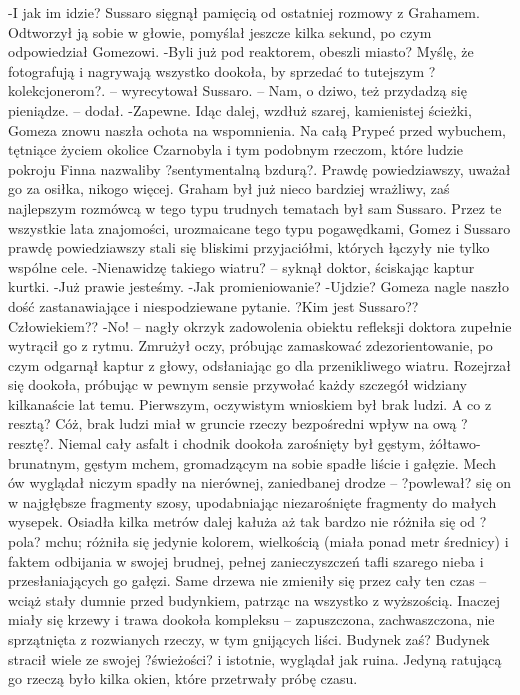 \documentclass[../MAIN.tex]{subfiles}
\begin{document}
-I jak im idzie?
Sussaro sięgnął pamięcią od ostatniej rozmowy z Grahamem. Odtworzył ją sobie w głowie, pomyślał jeszcze kilka sekund, po czym odpowiedział Gomezowi.
-Byli już pod reaktorem, obeszli miasto? Myślę, że fotografują i nagrywają wszystko dookoła, by sprzedać to tutejszym ?kolekcjonerom?. -- wyrecytował Sussaro. -- Nam, o dziwo, też przydadzą się pieniądze. -- dodał.
-Zapewne.
Idąc dalej, wzdłuż szarej, kamienistej ścieżki, Gomeza znowu naszła ochota na wspomnienia. Na całą Prypeć przed wybuchem, tętniące życiem okolice Czarnobyla i tym podobnym rzeczom, które ludzie pokroju Finna nazwaliby ?sentymentalną bzdurą?. Prawdę powiedziawszy, uważał go za osiłka, nikogo więcej. Graham był już nieco bardziej wrażliwy, zaś najlepszym rozmówcą w tego typu trudnych tematach był sam Sussaro. Przez te wszystkie lata znajomości, urozmaicane tego typu pogawędkami, Gomez i Sussaro prawdę powiedziawszy stali się bliskimi przyjaciółmi, których łączyły nie tylko wspólne cele.
-Nienawidzę takiego wiatru? -- syknął doktor, ściskając kaptur kurtki.
-Już prawie jesteśmy.
-Jak promieniowanie?
-Ujdzie?
Gomeza nagle naszło dość zastanawiające i niespodziewane pytanie.
?Kim jest Sussaro??
Człowiekiem??
-No! -- nagły okrzyk zadowolenia obiektu refleksji doktora zupełnie wytrącił go z rytmu. Zmrużył oczy, próbując zamaskować zdezorientowanie, po czym odgarnął kaptur z głowy, odsłaniając go dla przenikliwego wiatru. Rozejrzał się dookoła, próbując w pewnym sensie przywołać każdy szczegół widziany kilkanaście lat temu. Pierwszym, oczywistym wnioskiem był brak ludzi. A co z resztą?
Cóż, brak ludzi miał w gruncie rzeczy bezpośredni wpływ na ową ?resztę?.
Niemal cały asfalt i chodnik dookoła zarośnięty był gęstym, żółtawo-brunatnym, gęstym mchem, gromadzącym na sobie spadłe liście i gałęzie. Mech ów wyglądał niczym spadły na nierównej, zaniedbanej drodze -- ?powlewał? się on w najgłębsze fragmenty szosy, upodabniając niezarośnięte fragmenty do małych wysepek.
Osiadła kilka metrów dalej kałuża aż tak bardzo nie różniła się od ?pola? mchu; różniła się jedynie kolorem, wielkością (miała ponad metr średnicy) i faktem odbijania w swojej brudnej, pełnej zanieczyszczeń tafli szarego nieba i przesłaniających go gałęzi.
Same drzewa nie zmieniły się przez cały ten czas -- wciąż stały dumnie przed budynkiem, patrząc na wszystko z wyższością. Inaczej miały się krzewy i trawa dookoła kompleksu -- zapuszczona, zachwaszczona, nie sprzątnięta z rozwianych rzeczy, w tym gnijących liści.
Budynek zaś?
Budynek stracił wiele ze swojej ?świeżości? i istotnie, wyglądał jak ruina. Jedyną ratującą go rzeczą było kilka okien, które przetrwały próbę czasu.
\end{document}
